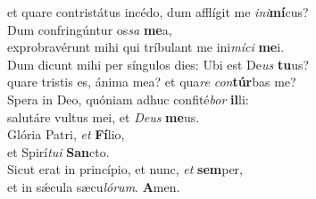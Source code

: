 \oddverse et quare contristátus incédo, dum afflígit me \textit{i}\textit{ni}\textbf{mí}cus?\\
\evenverse Dum confringúntur os\textit{sa} \textbf{me}a,~\*\\
\evenverse exprobravérunt mihi qui tríbulant me ini\textit{mí}\textit{ci} \textbf{me}i.\\
\oddverse Dum dicunt mihi per síngulos dies: Ubi est De\textit{us} \textbf{tu}us?~\*\\
\oddverse quare tristis es, ánima mea? et qua\textit{re} \textit{con}\textbf{túr}bas me?\\
\evenverse Spera in Deo, quóniam adhuc confité\textit{bor} \textbf{il}li:~\*\\
\evenverse salutáre vultus mei, et \textit{De}\textit{us} \textbf{me}us.\\
\oddverse Glória Patri, \textit{et} \textbf{Fí}lio,~\*\\
\oddverse et Spirí\textit{tu}\textit{i} \textbf{San}cto.\\
\evenverse Sicut erat in princípio, et nunc, \textit{et} \textbf{sem}per,~\*\\
\evenverse et in sǽcula sæcu\textit{ló}\textit{rum}. \textbf{A}men.\\
